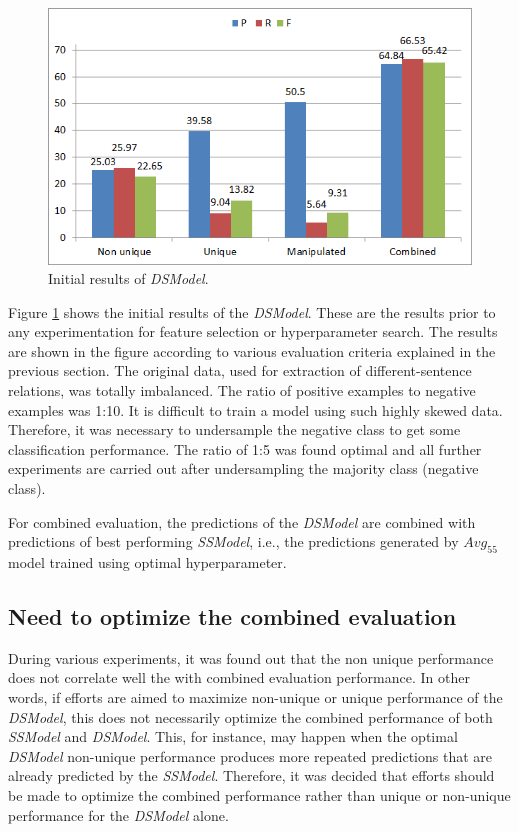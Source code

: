 \begin{figure}
\centering
\includegraphics[scale=0.7]{figures/DSInitialResults.png}
\caption{Initial results of \textit{DSModel}.}\label{fig:DSInitial}
\end{figure}

Figure \ref{fig:DSInitial} shows the initial results of the \textit{DSModel}. These are the results prior to any experimentation for feature selection or hyperparameter search. The results are shown in the figure according to various evaluation criteria explained in the previous section. The original data, used for extraction of different-sentence relations, was totally imbalanced. The ratio of positive examples to negative examples was 1:10. It is difficult to train a model using such highly skewed data. Therefore, it was necessary to undersample \cite{akbani2004applying} the negative class to get some classification performance. The ratio of 1:5 was found optimal and all further experiments are carried out after undersampling the majority class (negative class).

For combined evaluation, the predictions of the \textit{DSModel} are combined with predictions of best performing \textit{SSModel}, i.e., the predictions generated by $Avg_{55}$ model trained using optimal hyperparameter.

\subsection{Need to optimize the combined evaluation}

During various experiments, it was found out that the non unique performance does not correlate well the with combined evaluation performance. In other words, if efforts are aimed to maximize non-unique or unique performance of the \textit{DSModel}, this does not necessarily optimize the combined performance of both \textit{SSModel} and \textit{DSModel}. This, for instance, may happen when the optimal \textit{DSModel} non-unique performance produces more repeated predictions that are already predicted by the \textit{SSModel}. Therefore, it was decided that efforts should be made to optimize the combined performance rather than unique or non-unique performance for the \textit{DSModel} alone.

